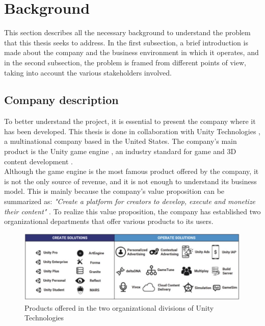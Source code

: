 \documentclass[english, 12pt, a4paper, sci, utf8, a-1b, online]{aaltothesis}
\begin{document}

\thispagestyle{empty}

\clearpage
\section{Background}
\label{sec:background}


This section describes all the necessary background to understand the problem that this thesis seeks to address. In the first subsection, a brief introduction is made about the company and the business environment in which it operates, and in the second subsection, the problem is framed from different points of view, taking into account the various stakeholders involved.

\subsection{Company description}


To better understand the project, it is essential to present the company where it has been developed. This thesis is done in collaboration with Unity Technologies \cite{UnityTechnologies}, a multinational company based in the United States. The company's main product is the Unity game engine \cite{haas2014history}, an industry standard for game and 3D content development  \cite{nicoll2019unity}.\\

Although the game engine is the most famous product offered by the company, it is not the only source of revenue, and it is not enough to understand its business model. This is mainly because the company's value proposition can be summarized as: \textit{"Create a platform for creators to develop, execute and monetize their content"} \cite{UnityBusinessModel}. To realize this value proposition, the company has established two organizational departments that offer various products to its users.\\

\begin{figure}[h]
    \centering
    \includegraphics[scale=0.3]{src/thesis/img/background/unity-division.jpg}
    \caption{Products offered in the two organizational divisions of Unity Technologies}
    \label{fig:unity-solutions}
\end{figure}
\end{document}

